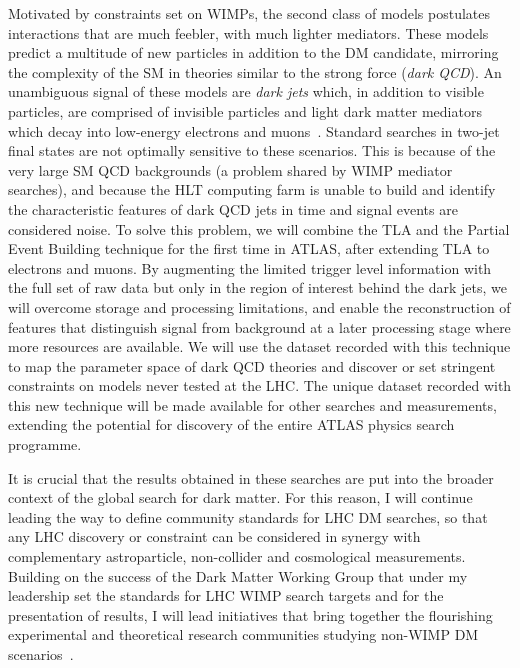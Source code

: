 \documentclass[11pt,a4paper]{article}
\begin{document}
Motivated by constraints set on WIMPs, the second class of models postulates interactions that are much feebler, with much lighter mediators. 
These models~\cite{Strassler:2006im,Cohen:2017pzm} predict a multitude of new particles in addition to the DM candidate, mirroring the complexity of the SM in theories similar to the strong force (\textit{dark QCD}). 
An unambiguous signal of these models are \textit{dark jets} which, in addition to visible particles, are comprised of invisible particles and light dark matter mediators which decay into low-energy electrons and muons~\cite{Curtin:2014cca}. 
Standard searches in two-jet final states are not optimally sensitive to these scenarios. %
This is because of the very large SM QCD backgrounds (a problem shared by WIMP mediator searches), and because the HLT computing farm is unable to build and identify the characteristic features of dark QCD jets in time and signal events are considered noise. 
To solve this problem, we will combine the TLA and the Partial Event Building technique for the first time in ATLAS, after extending TLA to electrons and muons. %
By augmenting the limited trigger level information with the full set of raw data but only in the region of interest behind the dark jets, we will overcome storage and processing limitations, and enable the reconstruction of features that distinguish signal from background at a later processing stage where more resources are available. 
We will use the dataset recorded with this technique to map the parameter space of dark QCD theories and discover or set stringent constraints on models never tested at the LHC. 
The unique dataset recorded with this new technique will be made available for other searches and measurements, extending the potential for discovery of the entire ATLAS physics search programme. 

It is crucial that the results obtained in these searches are put into the broader context of the global search for dark matter. %
For this reason, I will continue leading the way to define community standards for LHC DM searches, so that any LHC discovery or constraint can be considered %
in synergy with complementary astroparticle, non-collider and cosmological measurements. 
Building on the success of the Dark Matter Working Group that under my leadership set the standards for LHC WIMP search targets and for the presentation of results, I will lead initiatives that bring together the flourishing experimental and theoretical research communities studying non-WIMP DM scenarios~\cite{iDMEu}. 
\end{document}
